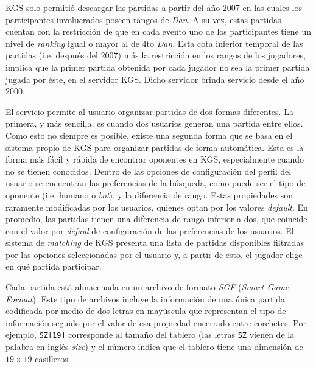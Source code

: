 \documentclass[11pt,twoside,spanish]{report} %
\begin{document}
KGS solo permiti\'o descargar las partidas a partir del a\~no 2007 en las cuales los participantes involucrados poseen rangos de \textit{Dan}.
A su vez, estas partidas cuentan con la restricci\'on de que en cada evento uno de los participantes tiene un nivel de \textit{ranking} igual o mayor al de 4to \textit{Dan}.
Esta cota inferior temporal de las partidas (i.e. despu\'es del 2007) m\'as la restricci\'on en los rangos de los jugadores, implica que la primer partida obtenida por cada jugador no sea la primer partida jugada por \'este, en el servidor KGS.
Dicho servidor brinda servicio desde el a\~no 2000.


El servicio permite al usuario organizar partidas de dos formas diferentes.
La primera, y m\'as sencilla, es cuando dos usuarios generan una partida entre ellos.
Como esto no siempre es posible, existe una segunda forma que se basa en el sistema propio de KGS para organizar partidas de forma autom\'atica.
Esta es la forma m\'as f\'acil y r\'apida de encontrar oponentes en KGS, especialmente cuando no se tienen conocidos.
Dentro de las opciones de configuraci\'on del perfil del usuario se encuentran las preferencias de la b\'usqueda, como puede ser el tipo de oponente (i.e. humano o \textit{bot}), y la diferencia de rango. 
Estas propiedades son raramente modificadas por los usuarios, quienes optan por los valores \emph{default}. 
En promedio, las partidas tienen una diferencia de rango inferior a dos, que coincide con el valor por \emph{defaul} de configuraci\'on de las preferencias de los usuarios.
El sistema de \emph{matching} de KGS presenta una lista de partidas disponibles filtradas por las opciones seleccionadas por el usuario y, a partir de esto, el jugador elige en qu\'e partida participar.

Cada partida est\'a almacenada en un archivo de formato \textit{SGF} (\textit{Smart Game Format}).
Este tipo de archivos incluye la informaci\'on de una \'unica partida codificada por medio de dos letras en may\'uscula que representan el tipo de informaci\'on seguido por el valor de esa propiedad encerrado entre corchetes.
Por ejemplo, \verb|SZ[19]| corresponde al tama\~no del tablero (las letras \verb|SZ| vienen de la palabra en ingl\'es \textit{size}) y el n\'umero indica que el tablero tiene una dimensi\'on de $19\times19$ casilleros.
\end{document}
